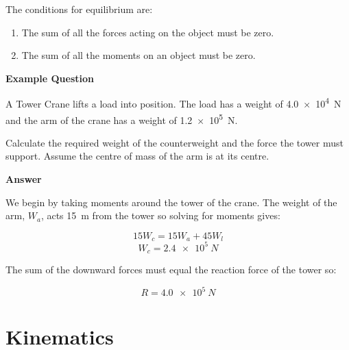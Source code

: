 \documentclass[a4paper,11pt,twoside]{memoir}
\newenvironment{example}
{\begin{lrbox}{\examplebox}\begin{minipage}{0.9\textwidth}\textbf{Example Question}\par}
{\end{minipage}\end{lrbox}\fbox{\usebox{\examplebox}}}
\begin{document}
The conditions for equilibrium are:
\begin{enumerate}
	\item The sum of all the forces acting on the object must be zero.
	\item The sum of all the moments on an object must be zero.
\end{enumerate}
\begin{example}
	A Tower Crane lifts a load into position. The load has a weight of \SI{4.0e4}{N} and the arm of the crane has a weight of \SI{1.2e5}{N}.

	Calculate the required weight of the counterweight and the force the tower must support. Assume the centre of mass of the arm is at its centre.

	\vspace{1cm}

		\begin{center}
		\end{center}

		\textbf{Answer}

		We begin by taking moments around the tower of the crane. The weight of the arm, $W_a$, acts \SI{15}{m} from the tower so solving for moments gives:

		$$ 15W_c = 15W_a + 45W_l $$
		$$ W_c = \SI{2.4e5}{N} $$

		The sum of the downward forces must equal the reaction force of the tower so:

		$$ R = \SI{4.0e5}{N} $$
\end{example}

\section{Kinematics}
\end{document}

